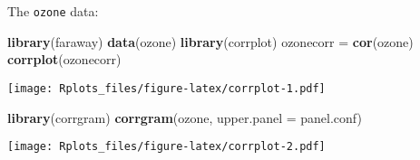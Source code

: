 \documentclass[]{article}
\newenvironment{Shaded}{\begin{snugshade}}{\end{snugshade}}
\newcommand{\KeywordTok}[1]{\textcolor[rgb]{0.13,0.29,0.53}{\textbf{#1}}}
\newcommand{\DataTypeTok}[1]{\textcolor[rgb]{0.13,0.29,0.53}{#1}}
\newcommand{\StringTok}[1]{\textcolor[rgb]{0.31,0.60,0.02}{#1}}
\newcommand{\NormalTok}[1]{#1}
\begin{document}
The \texttt{ozone} data:

\begin{Shaded}
\begin{Highlighting}[]
\KeywordTok{library}\NormalTok{(faraway)}
\KeywordTok{data}\NormalTok{(ozone)}
\KeywordTok{library}\NormalTok{(corrplot)}
\NormalTok{ozonecorr =}\StringTok{ }\KeywordTok{cor}\NormalTok{(ozone)}
\KeywordTok{corrplot}\NormalTok{(ozonecorr)}
\end{Highlighting}
\end{Shaded}

\texttt{[image: Rplots\_files/figure-latex/corrplot-1.pdf]}

\begin{Shaded}
\begin{Highlighting}[]
\KeywordTok{library}\NormalTok{(corrgram)}
\KeywordTok{corrgram}\NormalTok{(ozone, }\DataTypeTok{upper.panel =}\NormalTok{ panel.conf)}
\end{Highlighting}
\end{Shaded}

\texttt{[image: Rplots\_files/figure-latex/corrplot-2.pdf]}
\end{document}
